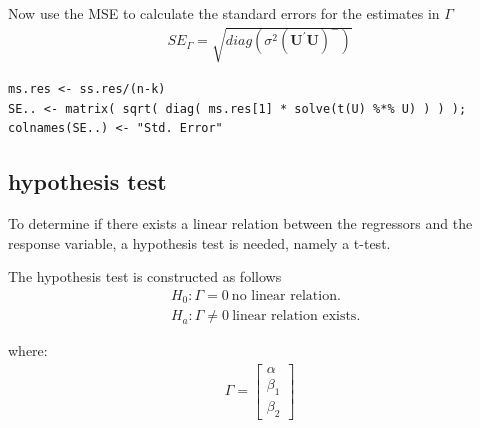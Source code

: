 \documentclass[10pt, twoside, openleft]{article}
\begin{document}
\noindent
Now use the MSE to calculate the standard errors for the estimates in $\Gamma$
\begin{equation*}
\begin{aligned}
SE_{\Gamma} = \sqrt{ diag(\sigma^{2} ( \mathbf{U}^{'} \mathbf{U})^{-} ) }
\end{aligned}
\end{equation*}
\smallskip

\begin{verbatim}
ms.res <- ss.res/(n-k)
SE.. <- matrix( sqrt( diag( ms.res[1] * solve(t(U) %*% U) ) ) );  colnames(SE..) <- "Std. Error"
\end{verbatim}

\begin{center}
\subsection{hypothesis test}
\vspace{-3ex}
\end{center}

\noindent
To determine if there exists a linear relation between the regressors and the
response variable, a hypothesis test is needed, namely a t-test.
\smallskip

\noindent
The hypothesis test is constructed as follows
\begin{equation*}
\begin{aligned}
& H_{0}: \Gamma = 0 \ \text{no linear relation.} \\
& H_{a}: \Gamma \neq 0 \ \text{linear relation exists.}
\end{aligned}
\end{equation*}
\smallskip

where:
\begin{equation*}
\begin{aligned}
\Gamma = 
\left[ \begin{array}{c}
    \alpha \\
    \beta_{1} \\
    \beta_{2} 
\end{array}\right]
\end{aligned}
\end{equation*}
\smallskip
\end{document}
